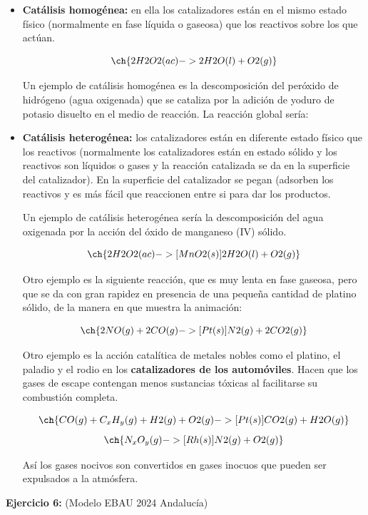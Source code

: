 \documentclass[
  spanish,
]{article}
\begin{document}
\begin{itemize}
\item
  \textbf{Catálisis homogénea:} en ella los catalizadores están en el
  mismo estado físico (normalmente en fase líquida o gaseosa) que los
  reactivos sobre los que actúan.

  \[\ch{2 H2O2 (ac) -> 2 H2O (l) + O2 (g)}\]

  Un ejemplo de catálisis homogénea es la descomposición del peróxido de
  hidrógeno (agua oxigenada) que se cataliza por la adición de yoduro de
  potasio disuelto en el medio de reacción. La reacción global sería:
\item
  \textbf{Catálisis heterogénea:} los catalizadores están en diferente
  estado físico que los reactivos (normalmente los catalizadores están
  en estado sólido y los reactivos son líquidos o gases y la reacción
  catalizada se da en la superficie del catalizador). En la superficie
  del catalizador se pegan (adsorben los reactivos y es más fácil que
  reaccionen entre si para dar los productos.

  Un ejemplo de catálisis heterogénea sería la descomposición del agua
  oxigenada por la acción del óxido de manganeso (IV) sólido.

  \[\ch{2 H2O2 (ac) ->[ MnO2 (s) ] 2 H2O (l) + O2 (g)}\]

  Otro ejemplo es la siguiente reacción, que es muy lenta en fase
  gaseosa, pero que se da con gran rapidez en presencia de una pequeña
  cantidad de platino sólido, de la manera en que muestra la animación:

  \[\ch{2 NO (g) + 2 CO (g) ->[ Pt (s)] N2 (g) + 2 CO2 (g)}\]

  Otro ejemplo es la acción catalítica de metales nobles como el
  platino, el paladio y el rodio en los \textbf{catalizadores de los
  automóviles}. Hacen que los gases de escape contengan menos sustancias
  tóxicas al facilitarse su combustión completa.

  \[\ch{CO (g) + C_xH_y (g) + H2 (g) + O2 (g) ->[ Pt (s) ] CO2 (g) + H2O (g)}\]
  \[\ch{N_xO_y (g) ->[ Rh (s) ] N2 (g) + O2 (g)}\]

  Así los gases nocivos son convertidos en gases inocuos que pueden ser
  expulsados a la atmósfera.
\end{itemize}

\textbf{Ejercicio 6:} (Modelo EBAU 2024 Andalucía)

\hfill{}
\end{document}
